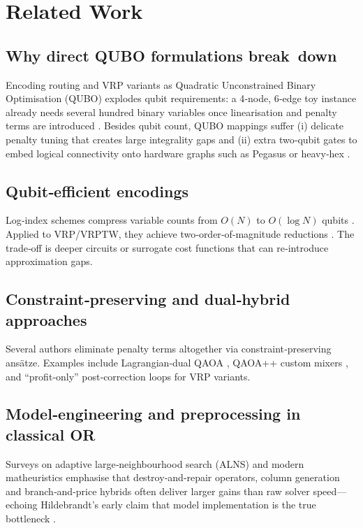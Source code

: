 \section{Related Work}
\label{sec:related_work}

\subsection{Why direct QUBO formulations break down}
Encoding routing and VRP variants as Quadratic Unconstrained Binary
Optimisation (QUBO) explodes qubit requirements: a {\small4‑node,
6‑edge} toy instance already needs several hundred binary variables once
linearisation and penalty terms are introduced
\cite{davies_quantum_2024}.  Besides qubit count, QUBO mappings suffer
(i) delicate penalty tuning that creates large integrality gaps
\cite{kochenberger2014qubo_review} and (ii) extra two‑qubit gates to
embed logical connectivity onto hardware graphs such as Pegasus or
heavy‑hex \cite{quinton2024annealing_limits}.

\subsection{Qubit‑efficient encodings}
Log‑index schemes compress variable counts from $O(N)$ to
$O(\log N)$ qubits \cite{tan_qubit-efficient_2021,
leonidas2024qubovrp}.  Applied to VRP/VRPTW, they achieve two‑order‑of‑magnitude
reductions \cite{sundar_qubit-efficient_2024}.  The trade‑off is
deeper circuits or surrogate cost functions that can re‑introduce
approximation gaps.

\subsection{Constraint‑preserving and dual‑hybrid approaches}
Several authors eliminate penalty terms altogether via
constraint‑preserving ansätze.  Examples include Lagrangian‑dual QAOA
\cite{gabbassov2023}, QAOA++ custom mixers \cite{fuchs2022}, and
“profit‑only” post‑correction loops \cite{chang2025} for VRP variants.

\subsection{Model‑engineering and preprocessing in classical OR}
Surveys on adaptive large‑neighbourhood search (ALNS)
\cite{windras_mara_alns_2022} and modern matheuristics
\cite{boschetti_matheuristics_2024} emphasise that destroy‑and‑repair
operators, column generation and branch‑and‑price hybrids often deliver
larger gains than raw solver speed—echoing Hildebrandt’s early claim
that model implementation is the true bottleneck
\cite{hildebrandt_bottleneck_1981}.

